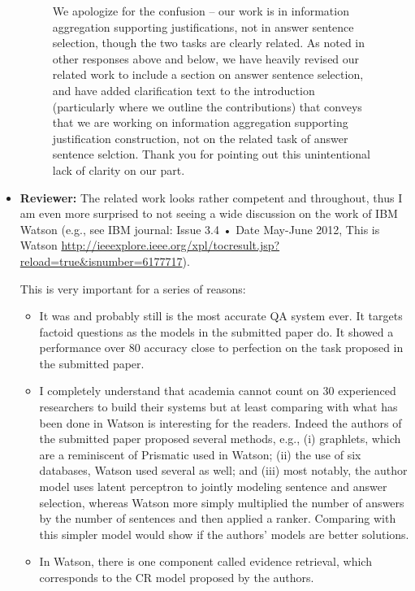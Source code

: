 \documentclass[10pt]{article}
\begin{document}
\begin{itemize}
\begin{figure}[H]
\caption{ We apologize for the confusion -- our work is in information aggregation supporting justifications, not in answer sentence selection, though the two tasks are clearly related.  As noted in other responses above and below, we have heavily revised our related work to include a section on answer sentence selection, and have added clarification text to the introduction (particularly where we outline the contributions) that conveys that we are working on information aggregation supporting justification construction, not on the related task of answer sentence selction.  Thank you for pointing out this unintentional lack of clarity on our part. }
\label{resp:agg}
\end{figure}



\item \textbf{Reviewer:} The related work looks rather competent and throughout, thus I am even
more surprised to not seeing a wide discussion on the work of IBM Watson
(e.g., see IBM journal: Issue 3.4 • Date May-June 2012, This is Watson
\url{http://ieeexplore.ieee.org/xpl/tocresult.jsp?reload=true&isnumber=6177717}).

This is very important for a series of reasons:
\begin{itemize}
        \item It was and probably still is the most accurate QA system ever. It
targets factoid questions as the models in the submitted paper do.
It showed a performance over 80%
accuracy close to perfection on the task proposed in the submitted paper.

        \item I completely understand that academia cannot count on 30 experienced
researchers to build their systems but at least comparing with what has been
done in Watson is interesting for the readers.
Indeed the authors of the submitted paper proposed several methods, e.g.,
(i) graphlets, which are a reminiscent of Prismatic used in Watson;  (ii)
the use of six databases, Watson used several as well; and (iii) most
notably, the author model uses latent perceptron to jointly modeling
sentence and answer selection, whereas Watson more simply multiplied the
number of answers by the number of sentences and then applied a ranker.
Comparing with this simpler model would show if the authors' models are
better solutions.

       \item In Watson, there is one component called evidence retrieval, which
corresponds to the CR model proposed by the authors.
\end{itemize}


\end{itemize}
\end{document}
